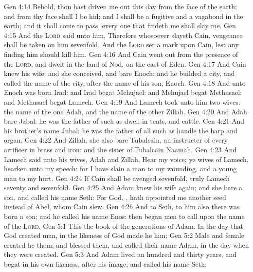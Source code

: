 \vs Gen 4:14 Behold, thou hast driven me out this day from the face of the earth; and from thy face shall I be hid; and I shall be a fugitive and a vagabond in the earth; and it shall come to pass,  every one that findeth me shall slay me.
\vs Gen 4:15 And the \textsc{Lord} said unto him, Therefore whosoever slayeth Cain, vengeance shall be taken on him sevenfold. And the \textsc{Lord} set a mark upon Cain, lest any finding him should kill him.
\vs Gen 4:16 And Cain went out from the presence of the \textsc{Lord}, and dwelt in the land of Nod, on the east of Eden.
\vs Gen 4:17 And Cain knew his wife; and she conceived, and bare Enoch: and he builded a city, and called the name of the city, after the name of his son, Enoch.
\vs Gen 4:18 And unto Enoch was born Irad: and Irad begat Mehujael: and Mehujael begat Methusael: and Methusael begat Lamech.
\vs Gen 4:19 And Lamech took unto him two wives: the name of the one  Adah, and the name of the other Zillah.
\vs Gen 4:20 And Adah bare Jabal: he was the father of such as dwell in tents, and  cattle.
\vs Gen 4:21 And his brother's name  Jubal: he was the father of all such as handle the harp and organ.
\vs Gen 4:22 And Zillah, she also bare Tubalcain, an instructer of every artificer in brass and iron: and the sister of Tubalcain  Naamah.
\vs Gen 4:23 And Lamech said unto his wives, Adah and Zillah, Hear my voice; ye wives of Lamech, hearken unto my speech: for I have slain a man to my wounding, and a young man to my hurt.
\vs Gen 4:24 If Cain shall be avenged sevenfold, truly Lamech seventy and sevenfold.
\vs Gen 4:25 And Adam knew his wife again; and she bare a son, and called his name Seth: For God, , hath appointed me another seed instead of Abel, whom Cain slew.
\vs Gen 4:26 And to Seth, to him also there was born a son; and he called his name Enos: then began men to call upon the name of the \textsc{Lord}.
\vs Gen 5:1 This  the book of the generations of Adam. In the day that God created man, in the likeness of God made he him;
\vs Gen 5:2 Male and female created he them; and blessed them, and called their name Adam, in the day when they were created.
\vs Gen 5:3 And Adam lived an hundred and thirty years, and begat  in his own likeness, after his image; and called his name Seth:
